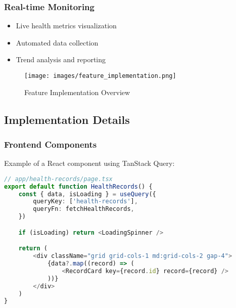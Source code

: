 \subsubsection{Real-time Monitoring}
\begin{itemize}
    \item Live health metrics visualization
    \item Automated data collection
    \item Trend analysis and reporting
\end{itemize}

\begin{figure}[H]
    \centering
    \texttt{[image: images/feature\_implementation.png]}
    \caption{Feature Implementation Overview}
\end{figure}

\subsection{Implementation Details}

\subsubsection{Frontend Components}
Example of a React component using TanStack Query:
\begin{lstlisting}[language=typescript,
                   basicstyle=\ttfamily\small,
                   keywordstyle=\color{blue},
                   stringstyle=\color{red},
                   commentstyle=\color{green!60!black}]
// app/health-records/page.tsx
export default function HealthRecords() {
    const { data, isLoading } = useQuery({
        queryKey: ['health-records'],
        queryFn: fetchHealthRecords,
    })

    if (isLoading) return <LoadingSpinner />

    return (
        <div className="grid grid-cols-1 md:grid-cols-2 gap-4">
            {data?.map((record) => (
                <RecordCard key={record.id} record={record} />
            ))}
        </div>
    )
}
\end{lstlisting}

